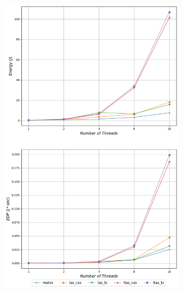 \begin{minipage}{\textwidth}
   \begin{center}
      \\
      \vspace{3mm}
      \includegraphics[width=0.7\textwidth]{./graphs/energy/grain-10.png}
      \vspace{6mm}
   \end{center}
\end{minipage}

